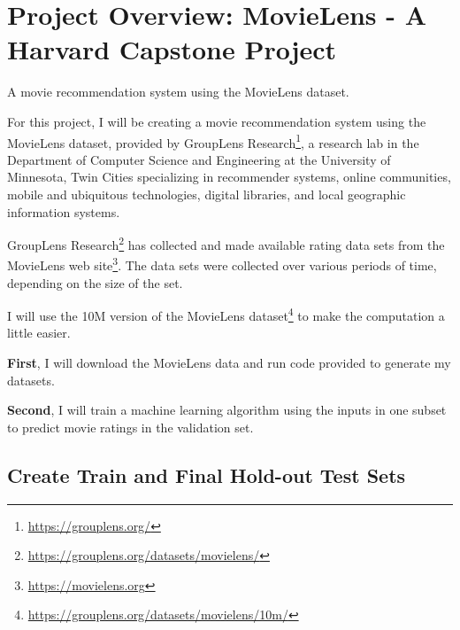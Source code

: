 \documentclass[
]{article}
\DeclareRobustCommand{\href}[2]{#2\footnote{\url{#1}}}
\begin{document}
\listoffigures
\clearpage

\newpage
\clearpage
{}
\newcommand{\listequationsname}{List of Equations}
\newcommand{\equations}[1]{%
\refstepcounter{equations}
\addcontentsline{equ}{equations}{ \protect\numberline{\theequations}#1}\par}

\renewcommand{\listequationsname}{}

\listofequations
\clearpage

\newpage


\hypertarget{project-overview-movielens---a-harvard-capstone-project}{%
\section{Project Overview: MovieLens - A Harvard Capstone
Project}\label{project-overview-movielens---a-harvard-capstone-project}}

A movie recommendation system using the MovieLens dataset.

For this project, I will be creating a movie recommendation system using
the MovieLens dataset, provided by
\href{https://grouplens.org/}{GroupLens Research}, a research lab in the
Department of Computer Science and Engineering at the University of
Minnesota, Twin Cities specializing in recommender systems, online
communities, mobile and ubiquitous technologies, digital libraries, and
local geographic information systems.

\href{https://grouplens.org/datasets/movielens/}{GroupLens Research} has
collected and made available rating data sets from the
\href{https://movielens.org}{MovieLens web site}. The data sets were
collected over various periods of time, depending on the size of the
set.

I will use the \href{https://grouplens.org/datasets/movielens/10m/}{10M
version of the MovieLens dataset} to make the computation a little
easier.

\textbf{First}, I will download the MovieLens data and run code provided
to generate my datasets.

\textbf{Second}, I will train a machine learning algorithm using the
inputs in one subset to predict movie ratings in the validation set.

\hypertarget{create-train-and-final-hold-out-test-sets}{%
\subsection{Create Train and Final Hold-out Test
Sets}\label{create-train-and-final-hold-out-test-sets}}
\end{document}
